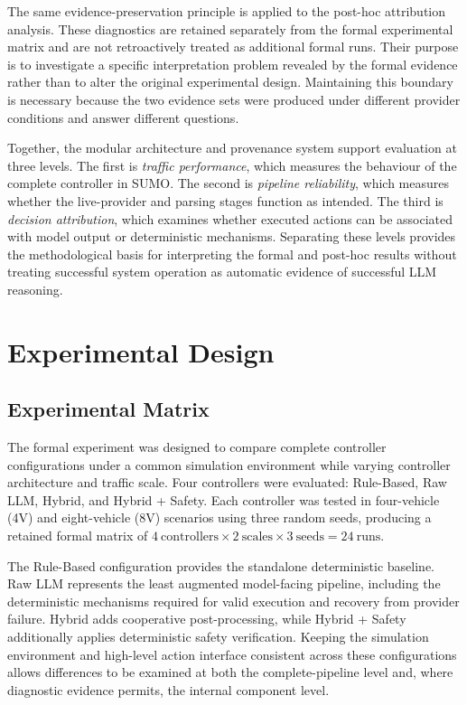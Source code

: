 \documentclass[letterpaper,10pt,conference]{ieeeconf}
\begin{document}
The same evidence-preservation principle is applied to the post-hoc attribution analysis. These diagnostics are retained separately from the formal experimental matrix and are not retroactively treated as additional formal runs. Their purpose is to investigate a specific interpretation problem revealed by the formal evidence rather than to alter the original experimental design. Maintaining this boundary is necessary because the two evidence sets were produced under different provider conditions and answer different questions.



Together, the modular architecture and provenance system support evaluation at three levels. The first is \emph{traffic performance}, which measures the behaviour of the complete controller in SUMO. The second is \emph{pipeline reliability}, which measures whether the live-provider and parsing stages function as intended. The third is \emph{decision attribution}, which examines whether executed actions can be associated with model output or deterministic mechanisms. Separating these levels provides the methodological basis for interpreting the formal and post-hoc results without treating successful system operation as automatic evidence of successful LLM reasoning.



\section{Experimental Design}

\label{sec:experimental_design}



\subsection{Experimental Matrix}



The formal experiment was designed to compare complete controller configurations under a common simulation environment while varying controller architecture and traffic scale. Four controllers were evaluated: Rule-Based, Raw LLM, Hybrid, and Hybrid + Safety. Each controller was tested in four-vehicle (4V) and eight-vehicle (8V) scenarios using three random seeds, producing a retained formal matrix of \(4\ \text{controllers} \times 2\ \text{scales} \times 3\ \text{seeds} = 24\ \text{runs}\).



The Rule-Based configuration provides the standalone deterministic baseline. Raw LLM represents the least augmented model-facing pipeline, including the deterministic mechanisms required for valid execution and recovery from provider failure. Hybrid adds cooperative post-processing, while Hybrid + Safety additionally applies deterministic safety verification. Keeping the simulation environment and high-level action interface consistent across these configurations allows differences to be examined at both the complete-pipeline level and, where diagnostic evidence permits, the internal component level.
\end{document}
